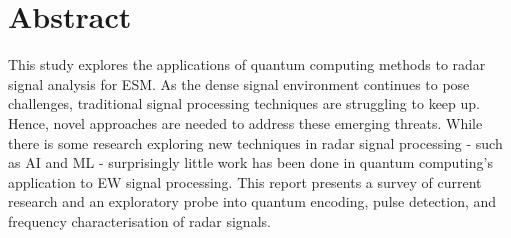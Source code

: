 \section*{Abstract}

This study explores the applications of quantum computing methods to radar signal analysis for \ac{ESM}.
As the dense signal environment continues to pose challenges, traditional signal processing techniques are struggling to keep up. Hence, novel approaches are needed to address these emerging threats.
While there is some research exploring new techniques in radar signal processing  - such as \ac{AI} and \ac{ML} - surprisingly little work has been done in quantum computing's application to \ac{EW} signal processing.
This report presents a survey of current research and an exploratory probe into quantum encoding, pulse detection, and frequency characterisation of radar signals.

